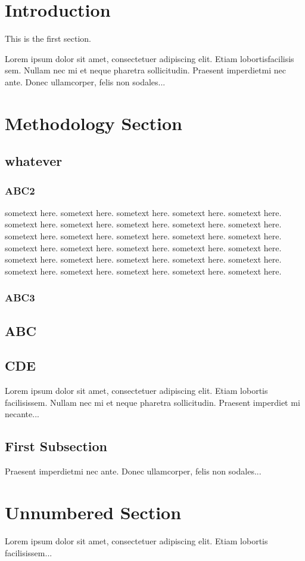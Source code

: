\documentclass{article}
\begin{document}

\section{Introduction}

This is the first section.

Lorem  ipsum  dolor  sit  amet,  consectetuer  adipiscing  
elit. Etiam  lobortisfacilisis sem.  Nullam nec mi et 
neque pharetra sollicitudin.  Praesent imperdietmi nec ante. 
Donec ullamcorper, felis non sodales...

\section{Methodology Section}
\subsection{whatever}
\subsubsection{ABC2}
sometext here. sometext here. sometext here. sometext here. sometext here. sometext here. sometext here. sometext here. sometext here. sometext here. 
sometext here. sometext here. sometext here. sometext here. sometext here. sometext here. sometext here. sometext here. sometext here. sometext here. 
sometext here. sometext here. sometext here. sometext here. sometext here. sometext here. sometext here. sometext here. sometext here. sometext here. 
\subsubsection{ABC3}
\subsection{ABC}
\subsection{CDE}
Lorem ipsum dolor sit amet, consectetuer adipiscing elit.  
Etiam lobortis facilisissem.  Nullam nec mi et neque pharetra 
sollicitudin.  Praesent imperdiet mi necante...

\subsection{First Subsection}
Praesent imperdietmi nec ante. Donec ullamcorper, felis non sodales...

\section*{Unnumbered Section}
Lorem ipsum dolor sit amet, consectetuer adipiscing elit.  
Etiam lobortis facilisissem...
\end{document}
